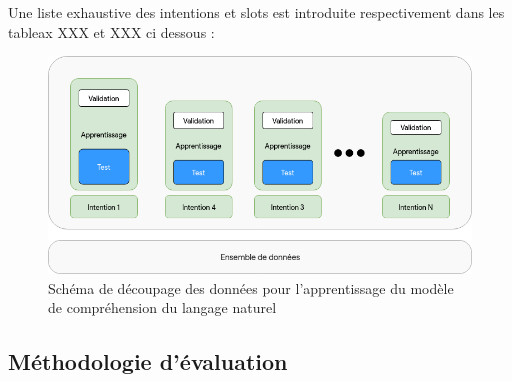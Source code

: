 	Une liste exhaustive des intentions et slots est introduite respectivement dans les tableax XXX et XXX ci dessous :
	\begin{figure}[H]
		\centering
		\includegraphics[width=.8\linewidth]{images/implementation/split.png} 
		\caption{Schéma de découpage des données pour l'apprentissage du modèle de compréhension du langage naturel} 
	\end{figure}
	\subsection{Méthodologie d'évaluation}
	\label{nlu_steps}

